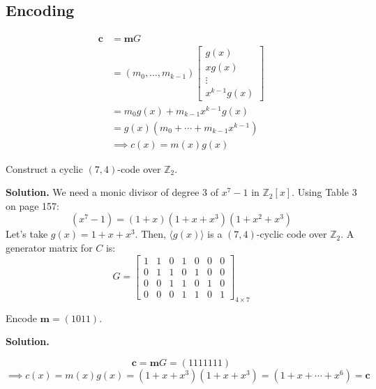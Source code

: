 \subsection*{Encoding}
\begin{align*}
    \symbf{c}
     & =\symbf{m}G                        \\
     & =(m_0,\ldots,m_{k-1})
    \begin{bmatrix}
        g(x)   \\
        xg(x)  \\
        \vdots \\
        x^{k-1}g(x)
    \end{bmatrix}             \\
     & =m_0g(x)+m_{k-1}x^{k-1}g(x)        \\
     & =g(x)(m_0+\cdots + m_{k-1}x^{k-1}) \\
     & \implies c(x)=m(x)g(x)
\end{align*}

\begin{Example}{}{}
    Construct a cyclic $ (7,4) $-code over $ \mathbb{Z}_2 $.

    \textbf{Solution.} We need a monic divisor
    of degree $ 3 $ of $ x^7-1 $ in $ \mathbb{Z}_2[x] $. Using
    Table 3 on page 157:
    \[ (x^7-1)=(1+x)(1+x+x^3)(1+x^2+x^3) \]
    Let's take $ g(x)=1+x+x^3 $. Then, $ \langle g(x)\rangle $ is a
    $ (7,4) $-cyclic code over $ \mathbb{Z}_2 $. A generator matrix
    for $ C $ is:
    \[ G=
        \begin{bmatrix}
            1 & 1 & 0 & 1 & 0 & 0 & 0 \\
            0 & 1 & 1 & 0 & 1 & 0 & 0 \\
            0 & 0 & 1 & 1 & 0 & 1 & 0 \\
            0 & 0 & 0 & 1 & 1 & 0 & 1
        \end{bmatrix}_{4\times 7} \]

    Encode $ \symbf{m}=(1011) $.

    \textbf{Solution.}

    \[ \symbf{c}=\symbf{m}G=(1111111) \]
    \[ \implies c(x)=m(x)g(x)=(1+x+x^3)(1+x+x^3)=(1+x+\cdots+x^6)=\symbf{c} \]
\end{Example}


